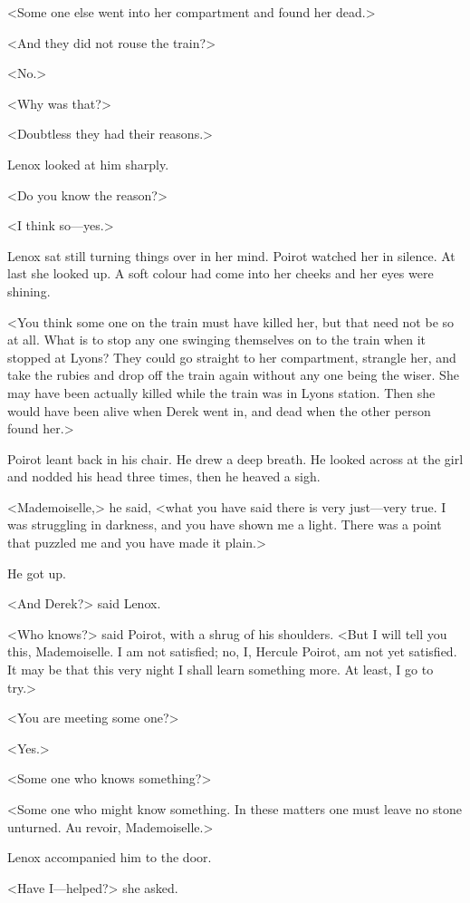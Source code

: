 <Some one else went into her compartment and found her dead.>

<And they did not rouse the train?>

<No.>

<Why was that?>

<Doubtless they had their reasons.>

Lenox looked at him sharply.

<Do you know the reason?>

<I think so—yes.>

Lenox sat still turning things over in her mind. Poirot watched her in silence. At last she looked up. A soft colour had come into her cheeks and her eyes were shining.

<You think some one on the train must have killed her, but that need not be so at all. What is to stop any one swinging themselves on to the train when it stopped at Lyons? They could go straight to her compartment, strangle her, and take the rubies and drop off the train again without any one being the wiser. She may have been actually killed while the train was in Lyons station. Then she would have been alive when Derek went in, and dead when the other person found her.>

Poirot leant back in his chair. He drew a deep breath. He looked across at the girl and nodded his head three times, then he heaved a sigh.

<Mademoiselle,> he said, <what you have said there is very just—very true. I was struggling in darkness, and you have shown me a light. There was a point that puzzled me and you have made it plain.>

He got up.

<And Derek?> said Lenox.

<Who knows?> said Poirot, with a shrug of his shoulders. <But I will tell you this, Mademoiselle. I am not satisfied; no, I, Hercule Poirot, am not yet satisfied. It may be that this very night I shall learn something more. At least, I go to try.>

<You are meeting some one?>

<Yes.>

<Some one who knows something?>

<Some one who might know something. In these matters one must leave no stone unturned. Au revoir, Mademoiselle.>

Lenox accompanied him to the door.

<Have I—helped?> she asked.


